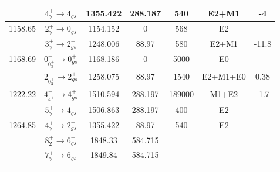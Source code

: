 \begin{ThreePartTable}
\begin{longtable}{>{\footnotesize}c|>{\footnotesize}c|>{\footnotesize}c|>{\footnotesize}c|>{\footnotesize}c|>{\footnotesize}c|>{\footnotesize}c}
	&	$4^+_{\gamma}	\rightarrow	4^+_{gs}$	&	1355.422	&	288.187	&	540	&	E2+M1	&	-4	\\ \hline
1158.65	&	$2^+_{\gamma}	\rightarrow	0^+_{gs}$	&	1154.152	&	0	&	568	&	E2	&		\\
	&	$3^+_{\gamma}	\rightarrow	2^+_{gs}$	&	1248.006	&	88.97	&	580	&	E2+M1	&	-11.8	\\ \hline
1168.69	&	$0^+_{0^+_{3}}	\rightarrow	0^+_{gs}$	&	1168.186	&	0	&	5000	&	E0	&		\\
	&	$2^+_{0^+_{3}}	\rightarrow	2^+_{gs}$	&	1258.075	&	88.97	&	1540	&	E2+M1+E0	&	0.38	\\ \hline
1222.22	&	$4^+_{4^+}	\rightarrow	4^+_{gs}$	&	1510.594	&	288.197	&	189000	&	M1+E2	&	-1.7	\\
	&	$5^+_{\gamma}	\rightarrow	4^+_{gs}$	&	1506.863	&	288.197	&	400	&	E2	&		\\ \hline
1264.85	&	$4^+_{\gamma}	\rightarrow	2^+_{gs}$	&	1355.422	&	88.97	&	540	&	E2	&		\\
	&	$8^+_2	\rightarrow	6^+_{gs}$	&	1848.33	&	584.715	&		&		\\
	&	$7^+_{\gamma}	\rightarrow	6^+_{gs}$	&	1849.84	&	584.715	&		&		\\ 
	&		&		&	&		&	\\ 
	\bottomrule
\end{longtable}
\end{ThreePartTable}
\pagebreak
